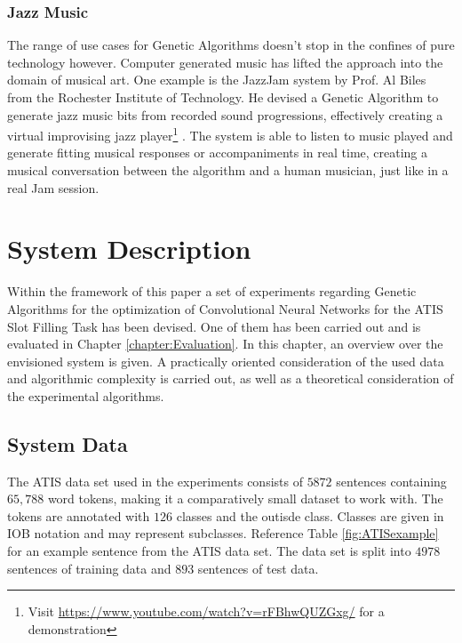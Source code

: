\documentclass[11pt,a4paper,twoside,openright]{scrbook}
\begin{document}
\subsection{Jazz Music}
The range of use cases for Genetic Algorithms doesn't stop in the confines of pure technology however. Computer generated music has lifted the approach into the domain of musical art. One example is the JazzJam system by Prof. Al Biles from the Rochester Institute of Technology. He devised a Genetic Algorithm to generate jazz music bits from recorded sound progressions, effectively creating a virtual improvising jazz player\footnote{Visit \url{https://www.youtube.com/watch?v=rFBhwQUZGxg/} for a demonstration} \cite{Biles94}.
The system is able to listen to music played and generate fitting musical responses or accompaniments in real time, creating a musical conversation between the algorithm and a human musician, just like in a real Jam session.


\chapter{System Description}

Within the framework of this paper a set of experiments regarding Genetic Algorithms for the optimization of Convolutional Neural Networks for the ATIS Slot Filling Task has been devised. One of them has been carried out and is evaluated in Chapter \ref{chapter:Evaluation}.
In this chapter, an overview over the envisioned system is given. A practically oriented consideration of the used data and algorithmic complexity is carried out, as well as a theoretical consideration of the experimental algorithms.

\section{System Data}

The ATIS data set used in the experiments consists of \(5872\) sentences containing \(65,788\) word tokens, making it a comparatively small dataset to work with.
The tokens are annotated with \(126\) classes and the outisde class. Classes are given in IOB notation and may represent subclasses. Reference Table \ref{fig:ATISexample} for an example sentence from the ATIS data set.
The data set is split into \(4978\) sentences of training data and \(893\) sentences of test data.
\end{document}
